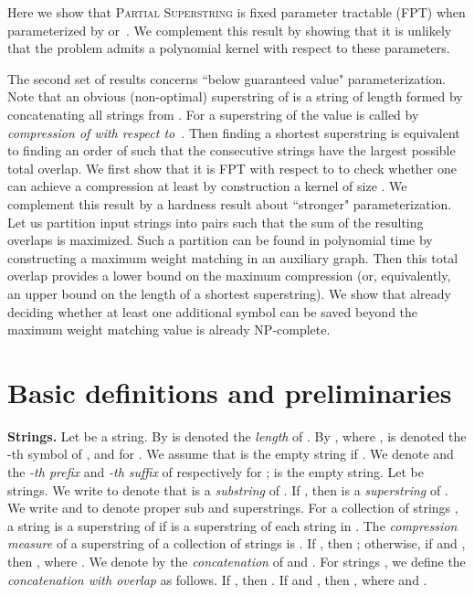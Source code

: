 \documentclass[11pt]{article}
\begin{document}
Here we show that \textsc{Partial Superstring} is fixed parameter tractable (FPT) 
when parameterized by  or~. We complement this result by showing that
it is unlikely that the problem admits a polynomial kernel with respect to these parameters.

\medskip

The second set of results concerns ``below guaranteed value" parameterization. 
 Note that
an obvious (non-optimal) superstring  of  is a string of length 
  formed by 
concatenating  all  strings from . 
For a superstring  of  the value  is called by \emph{compression
of  with respect to~}. Then finding a shortest superstring is equivalent to
  finding
an order of  such that the consecutive strings have the largest possible total overlap.
We first show that it is FPT with respect to  to check whether one can achieve a compression at least  by construction a kernel of size . 
We complement this result by a hardness result about ``stronger" parameterization.
Let us partition  input strings into  pairs such that the sum of the  resulting overlaps is maximized.
Such a partition can be found in polynomial time by constructing a maximum weight matching in an auxiliary graph.
Then this total overlap provides a lower bound on the maximum compression (or, equivalently, an upper bound
on the length of a shortest superstring). We show that already deciding whether at least one additional
symbol can be saved beyond the maximum weight matching value is already NP-complete. 

\section{Basic definitions and preliminaries}\label{sec:defs}
{\bf Strings.} Let  be a string. By  is denoted the \emph{length} of . By , where , is denoted the -th symbol of , and  for . We assume that  is the empty string if .
We denote  and   the \emph{-th prefix} and \emph{-th suffix} of  respectively for ;
 is the empty string.
Let  be strings. We write  to denote that  is a \emph{substring} of . If , then  is a \emph{superstring} of .
We write  and  to denote proper sub and superstrings.
For a collection of strings , a string  is a superstring of  if  is a superstring of each string in .
The \emph{compression measure} of a superstring  of a collection of strings  is .
 If , then ; otherwise, if  and , then , where . We denote by  the \emph{concatenation} of  and . 
For strings , we define the \emph{concatenation with overlap}  as follows. If , then . If  and , then , where  and .
\end{document}
